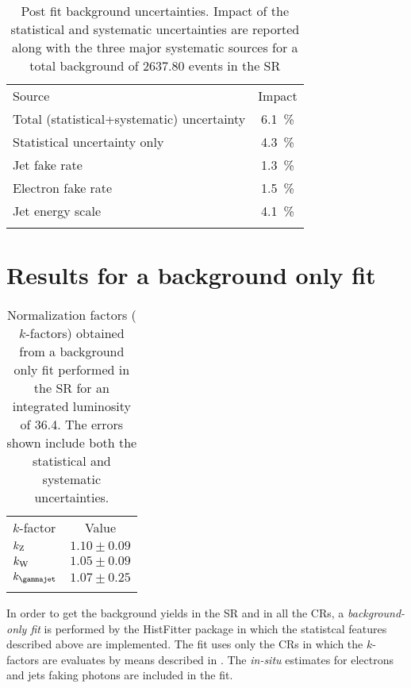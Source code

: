 \begin{table}[pt]
\centering
\begin{tabular}{lc}
\noalign{\smallskip}\toprule\noalign{\smallskip}
Source & Impact\\
\noalign{\smallskip}\midrule\noalign{\smallskip}
Total (statistical+systematic) uncertainty & \SI{6.1}{\percent}\\
Statistical uncertainty only & \SI{4.3}{\percent}\\
Jet fake rate & \SI{1.3}{\percent}\\
Electron fake rate& \SI{1.5}{\percent}\\ 
Jet energy scale& \SI{4.1}{\percent}\\
\noalign{\smallskip}\bottomrule\noalign{\smallskip}
\end{tabular}
\caption{Post fit background uncertainties. Impact of the statistical and systematic uncertainties are reported along with the three major systematic sources for a total background of $2637.80$ events in the SR}
\label{table:sys}
\end{table}

\section{Results for a background only fit}
\begin{table}[t]
\centering
\begin{tabular}{lc}
\noalign{\smallskip}\toprule\noalign{\smallskip}
$k$-factor&Value\\
\noalign{\smallskip}\midrule\noalign{\smallskip}
$k_{\textup{Z}}$& $1.10\pm0.09$\\
$k_{\textup{W}}$& $1.05\pm0.09$\\
$k_{\textup{\gammajet}}$& $1.07\pm0.25$\\
\noalign{\smallskip}\bottomrule\noalign{\smallskip}
\end{tabular}
\caption{Normalization factors ($k$-factors) obtained from a background only fit performed in the SR for an integrated luminosity of \SI{36.4}{\ifb}. The errors shown include both the statistical and systematic uncertainties.}
\label{tab:kfactors}
\end{table}
In order to get the background yields in the SR and in all the CRs, a \emph{background-only fit} is performed by the HistFitter package in which the statistcal features described above are implemented. The fit uses only the CRs in which the $k$-factors are evaluates by means described in \Sect{\ref{sec:kfactor}}. The \emph{in-situ} estimates for electrons and jets faking photons are included in the fit. 

